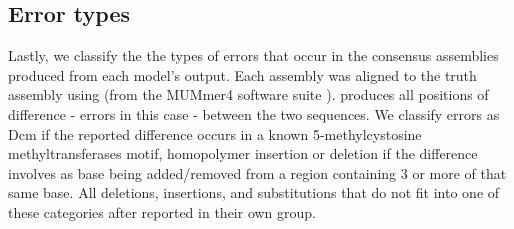 \begin{table}
\centering
{}
\caption{Consensus BLAST identity summary statistics for the test data. Where consensus refers to 10kbp "chunks" of the genome assembly produced by the basecalled reads, for each model, mapped to the truth genome. Version indicates the \guppy{} version used for the basecalling prior to, and after, training. BLAST identity is the number of matching bases (in a chunk alignment) divided by the length of the alignment. Count refers to the number of consensus chunks assessed. std=standard deviation.}
\label{tab:test-consensus-blast}
\end{table}

\subsection{Error types}
\label{sec:tubby-error-types}

Lastly, we classify the the types of errors that occur in the consensus assemblies produced from each model's output. Each  assembly was aligned to the truth assembly using  (from the MUMmer4 software suite \cite{mummer2018}).  produces all positions of difference - errors in this case - between the two sequences. We classify errors as Dcm if the reported difference occurs in a known 5-methylcystosine methyltransferases motif, homopolymer insertion or deletion if the difference involves as base being added/removed from a region containing 3 or more of that same base. All deletions, insertions, and substitutions that do not fit into one of these categories after reported in their own group.

